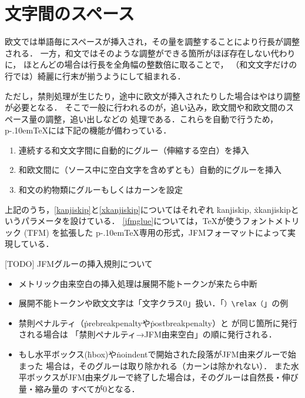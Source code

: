\documentclass[a4paper,11pt,nomag]{jsarticle}
\def\pTeX{p\kern-.10em\TeX}
\begin{document}
\section{文字間のスペース}

欧文では単語毎にスペースが挿入され，その量を調整することにより行長が調整される．
一方，和文ではそのような調整ができる箇所がほぼ存在しない代わりに，
ほとんどの場合は行長を全角幅の整数倍に取ることで，
（和文文字だけの行では）綺麗に行末が揃うようにして組まれる．

ただし，禁則処理が生じたり，途中に欧文が挿入されたりした場合はやはり調整が必要となる．
そこで一般に行われるのが，追い込み，欧文間や和欧文間のスペース量の調整，追い出しなどの
処理である．これらを自動で行うため，\pTeX には下記の機能が備わっている．
\begin{enumerate}
\item 連続する和文文字間に自動的にグルー（伸縮する空白）を挿入\label{kanjiskip}
\item 和欧文間に（ソース中に空白文字を含めずとも）自動的にグルーを挿入\label{xkanjiskip}
\item 和文の約物類にグルーもしくはカーンを設定\label{jfmglue}
\end{enumerate}
上記のうち，\ref{kanjiskip}と\ref{xkanjiskip}についてはそれぞれ
\.{kanjiskip}, \.{xkanjiskip}というパラメータを設けている．
\ref{jfmglue}については，\TeX が使うフォントメトリック (TFM) を拡張した
\pTeX 専用の形式，JFMフォーマットによって実現している．

[TODO] JFMグルーの挿入規則について
\begin{itemize}
 \item メトリック由来空白の挿入処理は展開不能トークンが来たら中断
 \item 展開不能トークンや欧文文字は「文字クラス0」扱い．「\verb+）\relax（+」の例
 \item 禁則ペナルティ（\.{prebreakpenalty}や\.{postbreakpenalty}）と
  が同じ箇所に発行される場合は
  「禁則ペナルティ→JFM由来空白」の順に発行される．
\iffalse %
 \item より一般に，禁則ペナルティ，JFM由来空白，ベースライン補正，
  欧文TFM由来カーンが同じ箇所に発行される場合は
  次の順になる（\ref{sec:kinsoku}節の注意の一般化）．%
  \begin{itemize}
   \item 和文→欧文：禁則ペナルティ→JFM由来空白→ベースライン補正→%
   欧文TFM由来カーン
   \item 欧文→和文：ベースライン補正→禁則ペナルティ→JFM由来空白
   \footnote{[TODO] \TeX~Live~2019の\pTeX~3.8.2では，欧文TFM由来カーンは欧文→和文の
   切替時には挿入されない．}%
  \end{itemize}
\fi %
 \item もし水平ボックス(\.{hbox})や\.{noindent}で開始された段落がJFM由来グルーで始まった
   場合は，そのグルーは取り除かれる（カーンは除かれない）．
   また水平ボックスがJFM由来グルーで終了した場合は，そのグルーは自然長・伸び量・縮み量の
   すべてが0となる．
\end{itemize}
\end{document}
